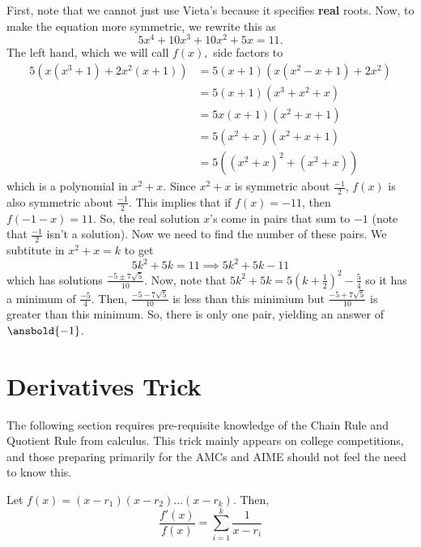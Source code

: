 \documentclass[mast]{lucky}
\begin{document}
\begin{sol}
First, note that we cannot just use Vieta\rq{}s because it specifies \textbf{real} roots. Now, to make the equation more symmetric, we rewrite this as \[5x^4+10x^3+10x^2+5x=11.\] The left hand, which we will call $f(x),$ side factors to
\begin{align*}
5(x(x^3+1)+2x^2(x+1))&=5(x+1)(x(x^2-x+1)+2x^2) \\
&=5(x+1)(x^3+x^2+x) \\
&=5x(x+1)(x^2+x+1) \\
&=5(x^2+x)(x^2+x+1) \\
&=5((x^2+x)^2+(x^2+x))
\end{align*} which is a polynomial in $x^2+x$. Since $x^2+x$ is symmetric about $\frac{-1}{2}$, $f(x)$ is also symmetric about $\frac{-1}{2}$. This implies that if $f(x)=-11$, then $f(-1-x)=11$. So, the real solution $x$\rq{}s come in pairs that sum to $-1$ (note that $\frac{-1}{2}$ isn\rq{}t a solution). Now we need to find the number of these pairs. We subtitute in $x^2+x=k$ to get \[5k^2+5k=11\implies 5k^2+5k-11\] which has solutions $\frac{-5 \pm 7\sqrt{5}}{10}$. Now, note that $5k^2+5k=5(k+\frac{1}{2})^2-\frac{5}{4}$ so it has a minimum of $\frac{-5}{4}$. Then, $\frac{-5-7\sqrt{5}}{10}$ is less than this minimium but $\frac{-5+7\sqrt{5}}{10}$ is greater than this minimum. So, there is only one pair, yielding an answer of $\ansbold{-1}$.
\end{sol}

\newpage
\section{Derivatives Trick}

The following section requires pre-requisite knowledge of the Chain Rule and Quotient Rule from calculus. This trick mainly appears on college competitions, and those preparing primarily for the AMCs and AIME should not feel the need to know this.

\begin{theo}
Let $f(x)=(x-r_{1})(x-r_{2})\ldots(x-r_{k})$. Then,
$$\frac{f'(x)}{f(x)} = \sum_{i=1}^{k} \frac{1}{x-r_{i}}$$
\end{theo}
\end{document}
